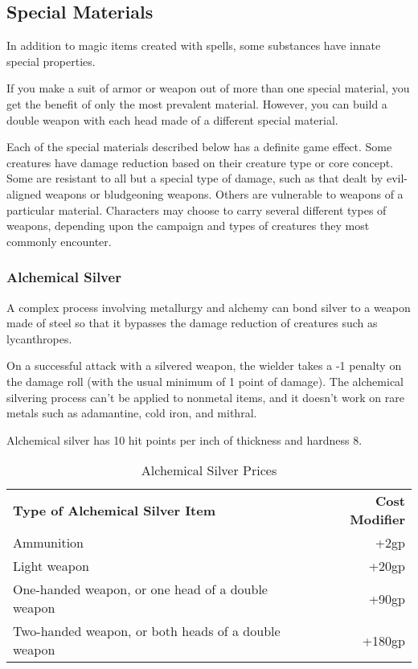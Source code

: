 \subsection{Special Materials}

In addition to magic items created with spells, some substances have innate special 
properties.

If you make a suit of armor or weapon out of more than one special material, you 
get the benefit of only the most prevalent material. However, you can build a double 
weapon with each head made of a different special material. 

Each of the special materials described below has a definite game effect. Some 
creatures have damage reduction based on their creature type or core concept. Some 
are resistant to all but a special type of damage, such as that dealt by evil-aligned 
weapons or bludgeoning weapons. Others are vulnerable to weapons of a particular 
material. Characters may choose to carry several different types of weapons, depending 
upon the campaign and types of creatures they most commonly encounter. 

\subsubsection{Alchemical Silver}

A complex process involving metallurgy and alchemy 
can bond silver to a weapon made of steel so that it bypasses the damage reduction 
of creatures such as lycanthropes.

On a successful attack with a silvered weapon, the wielder takes a -1 penalty on 
the damage roll (with the usual minimum of 1 point of damage). The alchemical silvering 
process can't be applied to nonmetal items, and it doesn't work on rare metals 
such as adamantine, cold iron, and mithral.

Alchemical silver has 10 hit points per inch of thickness and hardness 8.

\begin{table}[htb]
\caption{Alchemical Silver Prices}
\centering
\begin{tabular}{l r}
\textbf{Type of Alchemical Silver Item} & \textbf{Cost Modifier}\\
Ammunition & +2gp\\
Light weapon & +20gp\\
One-handed weapon, or one head of a double weapon & +90gp\\
Two-handed weapon, or both heads of a double weapon & +180gp\\
\end{tabular}
\end{table}

